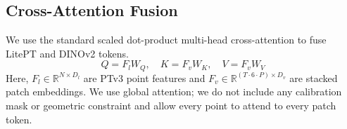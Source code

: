 \documentclass[10pt,twocolumn,letterpaper]{article}
\begin{document}
\subsection{Cross-Attention Fusion}
We use the standard scaled dot-product multi-head cross-attention to fuse LitePT and DINOv2 tokens.
\[
    Q = F_l W_Q, \quad K = F_v W_K, \quad V = F_v W_V
\]
Here, $F_l \in \mathbb{R}^{N \times D_l}$ are PTv3 point features and $F_v \in \mathbb{R}^{(T\cdot 6 \cdot P) \times D_v}$ are stacked patch embeddings. We use global attention; we do not include any calibration mask or geometric constraint and allow every point to attend to every patch token.
\end{document}
